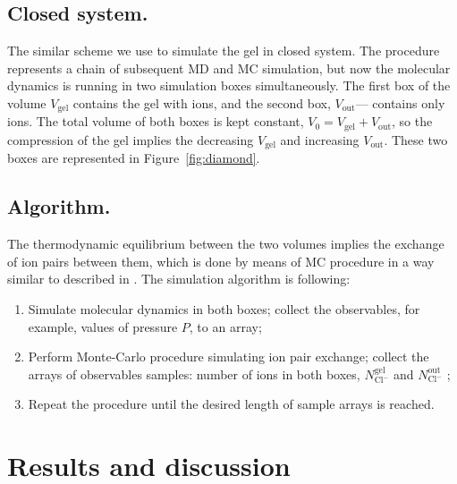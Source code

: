 \documentclass[journal,article,submit,pdftex,moreauthors]{Definitions/mdpi}
\newcommand{\nna}{n_\mathrm{Na^+}}
\newcommand{\Ncl}{N_\mathrm{Cl^-}}
\newcommand{\gel}{^\mathrm{gel}}
\newcommand{\out}{^{\mathrm{out}}}
\newcommand{\Vgel}{V_\mathrm{gel}}
\newcommand{\Vout}{V_\mathrm{out}}
\newcommand{\Vbox}{V_0}
\newcommand{\reffig}[1]{Figure~\ref{#1}}
\begin{document}
\subsection{Closed system.}
The similar scheme we use to simulate the gel in closed system. 
The procedure represents a chain of subsequent MD and MC simulation, but now the molecular dynamics is running in two simulation boxes simultaneously.
The first box of the volume $\Vgel$ contains the gel with ions, and the second box, $\Vout$--- contains only ions. 
The total volume of both boxes is kept constant, $\Vbox=V_{\mathrm{gel}}+V_{\mathrm{out}}$, so the compression of the gel implies the decreasing $\Vgel$ and increasing $\Vout$.
These two boxes are represented in \reffig{fig:diamond}. 

\subsection{Algorithm.}
The thermodynamic equilibrium between the two volumes implies the exchange of ion pairs between them, which is done by means of MC procedure in a way similar to described in \cite{Panagiotopoulos1988b}.
The simulation algorithm is following:
\begin{enumerate}
\item Simulate molecular dynamics in both boxes; collect the observables, for example, values of pressure $P$, to an array; 
\item Perform Monte-Carlo procedure simulating ion pair exchange; collect the arrays of observables samples: number of ions in both boxes, 
$\Ncl\gel$ 
and $\Ncl\out$ ; 
\item Repeat the procedure until the desired length of sample arrays is reached.
\end{enumerate}

\section{Results and discussion }
\end{document}
